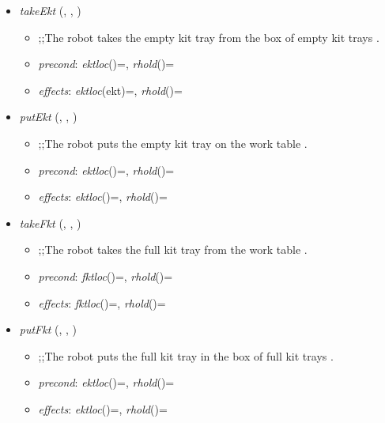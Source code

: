 \begin{itemize}
\renewcommand{\labelitemi}{$\blacksquare$}
\renewcommand{\labelitemii}{$\square$}

\item \textit{takeEkt} (\robot, \ekt, \boxekt)
\begin{itemize}
\item ;;The robot \robot takes the empty kit tray \ekt from the box of empty kit trays \boxekt.
\item \textit{precond}: \textit{ektloc}(\ekt)=\boxekt, \textit{rhold}(\robot)=\nil
\item \textit{effects}: \textit{ektloc}(ekt)=\robot, \textit{rhold}(\robot)=\ekt
\end{itemize}

\item \textit{putEkt} (\robot, \ekt, \wtable)
\begin{itemize}
\item ;;The robot \robot puts the empty kit tray \ekt on the work table \wtable.
\item \textit{precond}: \textit{ektloc}(\ekt)=\robot, \textit{rhold}(\robot)=\ekt
\item \textit{effects}: \textit{ektloc}(\ekt)=\wtable, \textit{rhold}(\robot)=\nil
\end{itemize}

\item \textit{takeFkt} (\robot, \fkt, \wtable)
\begin{itemize}
\item ;;The robot \robot takes the full kit tray \fkt from the work table \wtable.
\item \textit{precond}: \textit{fktloc}(\fkt)=\wtable, \textit{rhold}(\robot)=\nil
\item \textit{effects}: \textit{fktloc}(\fkt)=\robot, \textit{rhold}(\robot)=\fkt
\end{itemize}

\item \textit{putFkt} (\robot, \fkt, \boxekt)
\begin{itemize}
\item ;;The robot \robot puts the full kit tray \fkt in the box of full kit trays \boxfkt.
\item \textit{precond}: \textit{ektloc}(\fkt)=\robot, \textit{rhold}(\robot)=\fkt
\item \textit{effects}: \textit{ektloc}(\fkt)=\boxfkt, \textit{rhold}(\robot)=\nil
\end{itemize}


\end{itemize}

